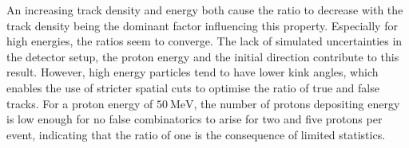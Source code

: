 An increasing track density and energy both cause the ratio to decrease with the track density being the dominant factor influencing this property. Especially for high energies,
the ratios seem to converge. The lack of simulated uncertainties in the detector setup,
the proton energy and the initial direction contribute to this result. However, high energy particles tend to have lower kink angles, which enables the use of
stricter spatial cuts to optimise the ratio of true and false tracks.
For a proton energy of $\SI{50}{\mega\eV}$, the number of protons depositing energy is low enough for no false combinatorics to arise for two and five
protons per event, indicating that the ratio of one is the consequence of limited statistics.
